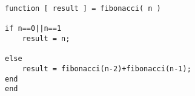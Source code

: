 \begin{verbatim}
function [ result ] = fibonacci( n )

if n==0||n==1
    result = n;

else
    result = fibonacci(n-2)+fibonacci(n-1);
end
end
\end{verbatim}
